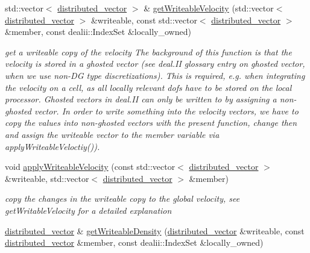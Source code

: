 \begin{DoxyCompactItemize}
\item 
\hypertarget{namespacenatrium_1_1CFDSolverUtilities_a23bc6f350850b22ee4f2a972693f8078}{
std::vector$<$ \hyperlink{namespacenatrium_a903d2b92917f582f2ff05f52160ab811}{distributed\_\-vector} $>$ \& \hyperlink{namespacenatrium_1_1CFDSolverUtilities_a23bc6f350850b22ee4f2a972693f8078}{getWriteableVelocity} (std::vector$<$ \hyperlink{namespacenatrium_a903d2b92917f582f2ff05f52160ab811}{distributed\_\-vector} $>$ \&writeable, const std::vector$<$ \hyperlink{namespacenatrium_a903d2b92917f582f2ff05f52160ab811}{distributed\_\-vector} $>$ \&member, const dealii::IndexSet \&locally\_\-owned)}
\label{namespacenatrium_1_1CFDSolverUtilities_a23bc6f350850b22ee4f2a972693f8078}

\begin{DoxyCompactList}\small\item\em get a writeable copy of the velocity The background of this function is that the velocity is stored in a ghosted vector (see deal.II glossary entry on ghosted vector, when we use non-\/DG type discretizations). This is required, e.g. when integrating the velocity on a cell, as all locally relevant dofs have to be stored on the local processor. Ghosted vectors in deal.II can only be written to by assigning a non-\/ghosted vector. In order to write something into the velocity vectors, we have to copy the values into non-\/ghosted vectors with the present function, change then and assign the writeable vector to the member variable via applyWriteableVeloctiy()). \item\end{DoxyCompactList}\item 
\hypertarget{namespacenatrium_1_1CFDSolverUtilities_a00773fb48b0a6ddfbb86e52a30544ee2}{
void \hyperlink{namespacenatrium_1_1CFDSolverUtilities_a00773fb48b0a6ddfbb86e52a30544ee2}{applyWriteableVelocity} (const std::vector$<$ \hyperlink{namespacenatrium_a903d2b92917f582f2ff05f52160ab811}{distributed\_\-vector} $>$ \&writeable, std::vector$<$ \hyperlink{namespacenatrium_a903d2b92917f582f2ff05f52160ab811}{distributed\_\-vector} $>$ \&member)}
\label{namespacenatrium_1_1CFDSolverUtilities_a00773fb48b0a6ddfbb86e52a30544ee2}

\begin{DoxyCompactList}\small\item\em copy the changes in the writeable copy to the global velocity, see getWritableVelocity for a detailed explanation \item\end{DoxyCompactList}\item 
\hypertarget{namespacenatrium_1_1CFDSolverUtilities_ada769f000dcb288b9e7ea99f7464bc56}{
\hyperlink{namespacenatrium_a903d2b92917f582f2ff05f52160ab811}{distributed\_\-vector} \& \hyperlink{namespacenatrium_1_1CFDSolverUtilities_ada769f000dcb288b9e7ea99f7464bc56}{getWriteableDensity} (\hyperlink{namespacenatrium_a903d2b92917f582f2ff05f52160ab811}{distributed\_\-vector} \&writeable, const \hyperlink{namespacenatrium_a903d2b92917f582f2ff05f52160ab811}{distributed\_\-vector} \&member, const dealii::IndexSet \&locally\_\-owned)}
\label{namespacenatrium_1_1CFDSolverUtilities_ada769f000dcb288b9e7ea99f7464bc56}


\end{DoxyCompactItemize}
